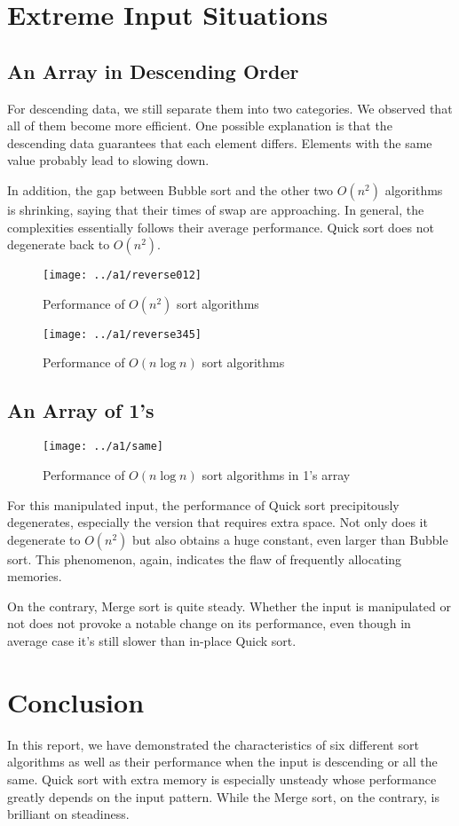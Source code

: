 \section{Extreme Input Situations}
\subsection{An Array in Descending Order}
For descending data, we still separate them into two categories. We observed that all of them become more efficient. One possible explanation is that the descending data guarantees that each element differs. Elements with the same value probably lead to slowing down.

In addition, the gap between Bubble sort and the other two $O(n^2)$ algorithms is shrinking, saying that their times of swap are approaching. In general, the complexities essentially follows their average performance. Quick sort does not degenerate back to $O(n^2)$.
\begin{figure}[H]
    \centering
    \texttt{[image: ../a1/reverse012]}
    \caption{Performance of $O(n^2)$ sort algorithms}\label{r012}
\end{figure}
\begin{figure}[H]
    \centering
    \texttt{[image: ../a1/reverse345]}
    \caption{Performance of $O(n\log n)$ sort algorithms}\label{r345}
\end{figure}

\subsection{An Array of 1's}
\begin{figure}[H]
    \centering
    \texttt{[image: ../a1/same]}
    \caption{Performance of $O(n\log n)$ sort algorithms in 1's array}\label{s}
\end{figure}
For this manipulated input, the performance of Quick sort precipitously degenerates, especially the version that requires extra space. Not only does it degenerate to $O(n^2)$ but also obtains a huge constant, even larger than Bubble sort. This phenomenon, again, indicates the flaw of frequently allocating memories.

On the contrary, Merge sort is quite steady. Whether the input is manipulated or not does not provoke a notable change on its performance, even though in average case it's still slower than in-place Quick sort.

\section{Conclusion}
In this report, we have demonstrated the characteristics of six different sort algorithms as well as their performance when the input is descending or all the same. Quick sort with extra memory is especially unsteady whose performance greatly depends on the input pattern. While the Merge sort, on the contrary, is brilliant on steadiness.


